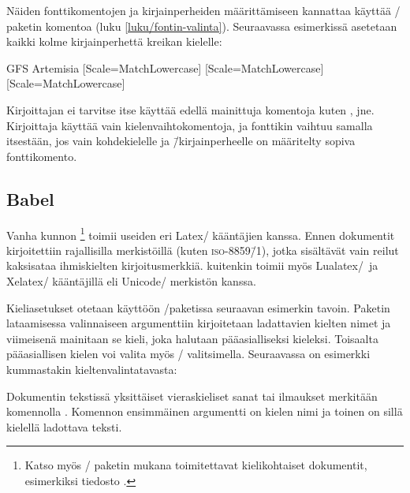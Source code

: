 Näiden fonttikomentojen ja kirjainperheiden määrittämiseen kannattaa
käyttää \-/ paketin komentoa 
(luku \ref{luku/fontin-valinta}). Seuraavassa esimerkissä asetetaan
kaikki kolme kirjainperhettä kreikan kielelle:

\begin{koodilohkosis}
\newfontfamily{\greekfont}  {GFS Artemisia}  [Scale=MatchLowercase]
[Scale=MatchLowercase]
[Scale=MatchLowercase]
\end{koodilohkosis}

\noindent
Kirjoittajan ei tarvitse itse käyttää edellä mainittuja komentoja kuten
,  jne. Kirjoittaja käyttää vain
kielenvaihtokomentoja, ja fonttikin vaihtuu samalla itsestään, jos vain
kohdekielelle ja \=/kirjainperheelle on määritelty sopiva fonttikomento.

\subsection{Babel}
\label{luku/babel}

Vanha kunnon \yipilkku\footnote{Katso myös
  \-/ paketin mukana toimitettavat kielikohtaiset
  dokumentit, esimerkiksi tiedosto .} toimii useiden
eri Latex\-/ kääntäjien kanssa. Ennen dokumentit kirjoitettiin
rajallisilla merkistöillä (kuten \textsc{iso-8859\=/1}), jotka
sisältävät vain reilut kaksisataa ihmiskielten kirjoitusmerkkiä.
 kuitenkin toimii myös Lualatex\-/\ ja Xelatex\-/
kääntäjillä eli Unicode\-/ merkistön kanssa.

Kieliasetukset otetaan käyttöön \-/paketissa seuraavan
esimerkin tavoin. Paketin lataamisessa valinnaiseen argumenttiin
kirjoitetaan ladattavien kielten nimet ja viimeisenä mainitaan se kieli,
joka halutaan pääasialliseksi kieleksi. Toisaalta pääasiallisen kielen
voi valita myös \-/ valitsimella. Seuraavassa on esimerkki
kummastakin kieltenvalintatavasta:

\begin{koodilohkosis}
\usepackage[english,greek,finnish]{babel}
\usepackage[main=finnish,english,greek]{babel}
\end{koodilohkosis}

\noindent
Dokumentin tekstissä yksittäiset vieraskieliset sanat tai ilmaukset
merkitään komennolla . Komennon ensimmäinen
argumentti on kielen nimi ja toinen on sillä kielellä ladottava teksti.

